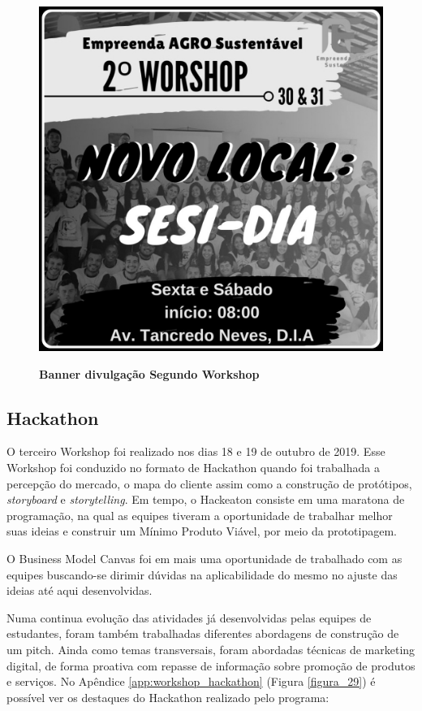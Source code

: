 \begin{figure}[H]
\centering
\caption{\textbf{Banner divulgação Segundo Workshop}}
\includegraphics[scale=0.23]{Imagens/2_workshop.jpg}
\label{fig:ods}
\end{figure}

\subsection{Hackathon}

O terceiro Workshop foi realizado nos dias 18 e 19 de outubro de 2019. Esse Workshop foi conduzido no formato de Hackathon quando foi trabalhada a percepção do mercado, o mapa do cliente assim como a construção de protótipos, \textit{storyboard} e \textit{storytelling}. Em tempo, o Hackeaton consiste em uma maratona de programação, na qual as equipes tiveram a oportunidade de trabalhar melhor suas ideias e construir um Mínimo Produto Viável, por meio da prototipagem. 

O Business Model Canvas foi em mais uma oportunidade de trabalhado com as equipes buscando-se dirimir dúvidas na aplicabilidade do mesmo no ajuste das ideias até aqui desenvolvidas.

Numa continua evolução das atividades já desenvolvidas pelas equipes de estudantes, foram também trabalhadas diferentes abordagens de construção de um pitch. Ainda como temas transversais, foram abordadas técnicas de marketing digital, de forma proativa com repasse de informação sobre promoção de produtos e serviços. No Apêndice \ref{app:workshop_hackathon} (Figura \ref{figura_29}) é possível ver os destaques do Hackathon realizado pelo programa:



